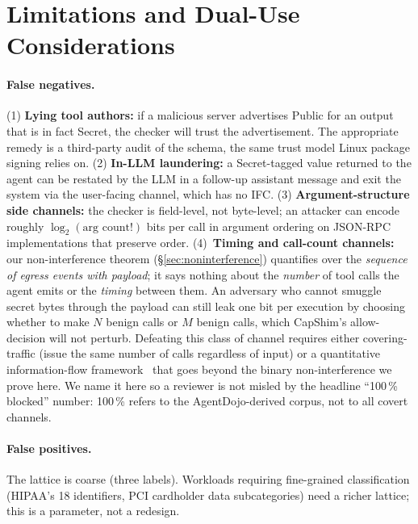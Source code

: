 \documentclass[11pt,a4paper]{article}
\begin{document}



\appendix
\section{Limitations and Dual-Use Considerations}

\paragraph{False negatives.} (1) \textbf{Lying tool authors:}
if a malicious server advertises Public for an output that is in
fact Secret, the checker will trust the advertisement. The
appropriate remedy is a third-party audit of the schema, the same
trust model Linux package signing relies on. (2) \textbf{In-LLM
laundering:} a Secret-tagged value returned to the agent can be
restated by the LLM in a follow-up assistant message and exit the
system via the user-facing channel, which has no IFC. (3)
\textbf{Argument-structure side channels:} the checker is
field-level, not byte-level; an attacker can encode roughly
$\log_2(\text{arg count}!)$ bits per call in argument ordering on
JSON-RPC implementations that preserve order.
(4)~\textbf{Timing and call-count channels:} our non-interference
theorem (\S\ref{sec:noninterference}) quantifies over the
\emph{sequence of egress events with payload}; it says nothing
about the \emph{number} of tool calls the agent emits or the
\emph{timing} between them. An adversary who cannot smuggle secret
bytes through the payload can still leak one bit per execution by
choosing whether to make $N$ benign calls or $M$ benign calls,
which CapShim's allow-decision will not perturb. Defeating this
class of channel requires either covering-traffic (issue the same
number of calls regardless of input) or a quantitative
information-flow framework~\cite{sabelfeld2003language} that goes
beyond the binary non-interference we prove here. We name it here
so a reviewer is not misled by the headline ``100\,\% blocked''
number: 100\,\% refers to the AgentDojo-derived corpus, not to all
covert channels.

\paragraph{False positives.} The lattice is coarse (three labels).
Workloads requiring fine-grained classification (HIPAA's 18
identifiers, PCI cardholder data subcategories) need a richer
lattice; this is a parameter, not a redesign.
\end{document}
